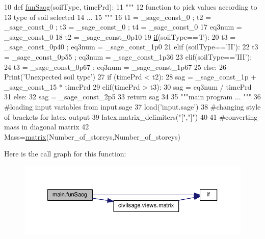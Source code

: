 \begin{DoxyCode}
10 \textcolor{keyword}{def }\hyperlink{namespacemain_a4f60afd2426ee9409955e4352b3f0486}{funSaog}(soilType, timePrd):
11   \textcolor{stringliteral}{"""}
12 \textcolor{stringliteral}{  function to pick values according to}
13 \textcolor{stringliteral}{  type of soil selected}
14 \textcolor{stringliteral}{  ...}
15 \textcolor{stringliteral}{  """}
16   t1 = \_sage\_const\_0 ; t2 = \_sage\_const\_0 ; t3 = \_sage\_const\_0 ; t4 = \_sage\_const\_0 
17   eq3num = \_sage\_const\_0 
18   t2 = \_sage\_const\_0p10 
19   \hyperlink{bootstrap_8min_8js_ac2d69f5011896c6ed4a54e0dd36f6334}{if}(soilType==\textcolor{stringliteral}{'I'}):
20       t3 = \_sage\_const\_0p40 ; eq3num = \_sage\_const\_1p0 
21   \textcolor{keywordflow}{elif} (soilType==\textcolor{stringliteral}{'II'}):
22       t3 = \_sage\_const\_0p55 ; eq3num = \_sage\_const\_1p36 
23   elif(soilType==\textcolor{stringliteral}{'III'}):
24       t3 = \_sage\_const\_0p67 ; eq3num = \_sage\_const\_1p67 
25   \textcolor{keywordflow}{else}:
26       Print(\textcolor{stringliteral}{'Unexpected soil type'})
27   \textcolor{keywordflow}{if} (timePrd < t2):
28       sag = \_sage\_const\_1p  + \_sage\_const\_15  * timePrd
29   elif(timePrd > t3):
30       sag = eq3num / timePrd
31   \textcolor{keywordflow}{else}:
32       sag = \_sage\_const\_2p5 
33   \textcolor{keywordflow}{return} sag
34 
35 \textcolor{stringliteral}{"""main program ... """}
36 \textcolor{comment}{#loading input variables from input.sage}
37 load(\textcolor{stringliteral}{'input.sage'})
38 \textcolor{comment}{#changing style of brackets for latex output}
39 latex.matrix\_delimiters(\textcolor{stringliteral}{"["},\textcolor{stringliteral}{"]"})
40 
41 \textcolor{comment}{#converting mass in diagonal matrix}
42 Mass=\hyperlink{namespacecivilsage_1_1views_a8b58c93a9c82e84143c43dafaa744a4b}{matrix}(Number\_of\_storeys,Number\_of\_storeys)
\end{DoxyCode}


Here is the call graph for this function\+:\nopagebreak
\begin{figure}[H]
\begin{center}
\leavevmode
\includegraphics[width=350pt]{namespacemain_a4f60afd2426ee9409955e4352b3f0486_cgraph}
\end{center}
\end{figure}




